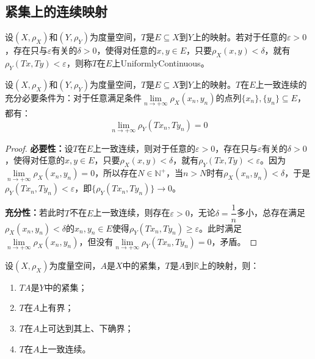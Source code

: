 \subsection{紧集上的连续映射}
\begin{definition}
	设$(X,\rho_X)$和$(Y,\rho_Y)$为度量空间，$T$是$E\subseteq X$到$Y$上的映射。若对于任意的$\varepsilon>0$，存在只与$\varepsilon$有关的$\delta>0$，使得对任意的$x,y\in E$，只要$\rho_X(x,y)<\delta$，就有$\rho_Y(Tx,Ty)<\varepsilon$，则称$T$在$E$上\gls{UniformlyContinuous}。
\end{definition}
\begin{theorem}
	设$(X,\rho_X)$和$(Y,\rho_Y)$为度量空间，$T$是$E\subseteq X$到$Y$上的映射。$T$在$E$上一致连续的充分必要条件为：对于任意满足条件$\lim\limits_{n\to+\infty}\rho_X(x_n,y_n)$的点列$\{x_n\},\{y_n\}\subseteq E$，都有：
	\begin{equation*}
		\lim_{n\to+\infty}\rho_Y(Tx_n,Ty_n)=0
	\end{equation*}
\end{theorem}
\begin{proof}
	\textbf{必要性：}设$T$在$E$上一致连续，则对于任意的$\varepsilon>0$，存在只与$\varepsilon$有关的$\delta>0$，使得对任意的$x,y\in E$，只要$\rho_X(x,y)<\delta$，就有$\rho_Y(Tx,Ty)<\varepsilon$。因为$\lim\limits_{n\to+\infty}\rho_X(x_n,y_n)=0$，所以存在$N\in\mathbb{N}^+$，当$n>N$时有$\rho_X(x_n,y_n)<\delta$，于是$\rho_Y(Tx_n,Ty_n)<\varepsilon$，即$\{\rho_Y(Tx_n,Ty_n)\}\to 0$。\par
	\textbf{充分性：}若此时$T$不在$E$上一致连续，则存在$\varepsilon>0$，无论$\delta=\dfrac{1}{n}$多小，总存在满足$\rho_X(x_n,y_n)<\delta$的$x_n,y_n\in E$使得$\rho_Y(Tx_n,Ty_n)\geqslant\varepsilon$。此时满足$\lim\limits_{n\to+\infty}\rho_X(x_n,y_n)$，但没有$\lim\limits_{n\to+\infty}\rho_Y(Tx_n,Ty_n)=0$，矛盾。
\end{proof}
\begin{property}\label{prop:CompactMap}
	设$(X,\rho_X)$为度量空间，$A$是$X$中的紧集，$T$是$A$到$\mathbb{R}$上的映射，则：
	\begin{enumerate}
		\item $TA$是$Y$中的紧集；
		\item $T$在$A$上有界；
		\item $T$在$A$上可达到其上、下确界；
		\item $T$在$A$上一致连续。
	\end{enumerate}
\end{property}
